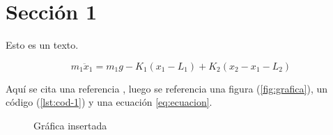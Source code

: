 \section{Sección 1}

Esto es un texto.

\lipsum[1-3][5-]

\begin{equation}
  m_{1}\ddot x_{1} = m_{1}g - K_{1}\left(x_{1} - L_{1}\right) + K_{2}
                \left(x_{2} - x_{1} - L_{2}\right)
  \label{eq:ecuacion}
\end{equation}

Aquí se cita una referencia \cite{apunte-sld}, luego se referencia una figura
(\autoref{fig:grafica}), un código (\autoref{lst:cod-1}) y una ecuación \eqref{eq:ecuacion}.

\begin{figure}[ht!]
  \centering
  
  \caption{Gráfica insertada}
  \label{fig:grafica}
\end{figure}
